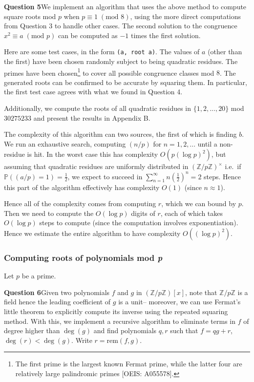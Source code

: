\documentclass[12pt]{article}
\newcommand{\textmod}[1]{\;(\text{mod }#1)}
\begin{document}
\textbf{Question 5}\quad We implement an algorithm that uses the above method to
compute square roots mod \(p\) when \(p\equiv 1 \textmod{8}\), using the more
direct computations from Question 3 to handle other cases. The second solution
to the congruence \(x^2\equiv a \textmod{p}\) can be computed as \(-1\) times the first
solution. 

Here are some test cases, in the form \texttt{(a, root a)}. The values of \(a\)
(other than the first) have been chosen randomly subject to being quadratic
residues. The primes have been chosen\footnote{The first prime is the largest
known Fermat prime, while the latter four are relatively large palindromic
primes [OEIS: A055578].} to cover all possible congruence classes mod \(8\). The
generated roots can be confirmed to be accurate by squaring them. In particular,
the first test case agrees with what we found in Question 4.



Additionally, we compute the roots of all quadratic residues in
\(\{1,2,...,20\}\) mod \(30275233\) and present the results in Appendix B.

The complexity of this algorithm can two sources, the first of which is finding
\(b\). We run an exhaustive search, computing \((n/p)\) for \(n=1,2,...\) until
a non-residue is hit. In the worst case this has complexity \(O(p(\log p)^2)\),
but assuming that quadratic residues are uniformly distributed in
\((\mathbb{Z}/p\mathbb{Z})^\times\) i.e.\ if \(\mathbb{P}((a/p)=1) =
\frac{1}{2}\), we expect to succeed in \(\sum_{n=1}^\infty n (\frac{1}{2})^n =
2\) steps. Hence this part of the algorithm effectively has complexity
\(O(1)\) (since \(n\approx 1\)). 

Hence all of the complexity comes from computing \(r\), which we can bound by
\(p\). Then we need to compute the \(O(\log p)\) digits of \(r\), each of
which takes \(O(\log p)\) steps to compute (since the computation involves
exponentiation). Hence we estimate the entire algorithm to have complexity
\(O((\log p)^2)\).

\subsubsection{Computing roots of polynomials mod \textit{p}}
Let \(p\) be a prime.

\textbf{Question 6}\quad Given two polynomials \(f\) and \(g\) in
\((\mathbb{Z}/p\mathbb{Z})[x]\), note that \(\mathbb{Z}/p\mathbb{Z}\) is a field
hence the leading coefficient of \(g\) is a unit-- moreover, we can use Fermat's
little theorem to explicitly compute its inverse using the repeated squaring
method. With this, we implement a recursive algorithm to eliminate terms in
\(f\) of degree higher than \(\deg(g)\) and find polynomials \(q,r\) such that
\(f = qg+r\), \(\deg(r)<\deg(g)\). Write \(r=\text{rem}(f,g)\). 
\end{document}
